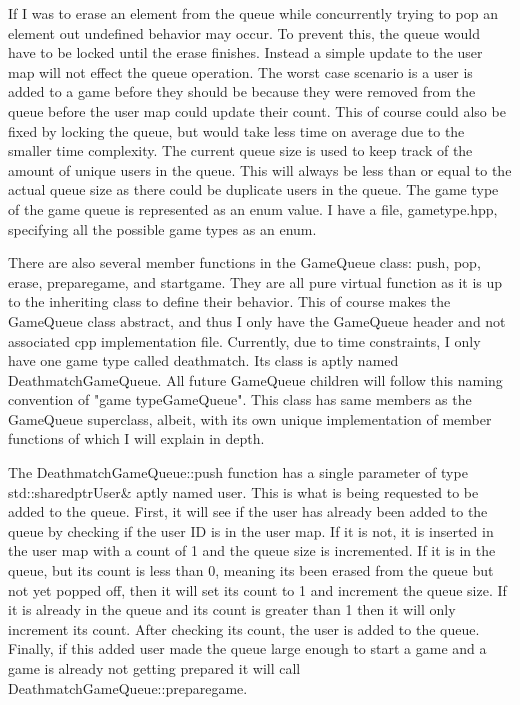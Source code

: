 \documentclass[conference]{IEEEtran}
\begin{document}
If I was to erase an element from the queue while concurrently trying to pop an element out undefined behavior may occur.
To prevent this, the queue would have to be locked until the erase finishes.
Instead a simple update to the user map will not effect the queue operation.
The worst case scenario is a user is added to a game before they should be because they were removed from the queue before the user map could update their count.
This of course could also be fixed by locking the queue, but would take less time on average due to the smaller time complexity.
The current queue size is used to keep track of the amount of unique users in the queue.
This will always be less than or equal to the actual queue size as there could be duplicate users in the queue.
The game type of the game queue is represented as an enum value.
I have a file, game\textunderscore type.hpp, specifying all the possible game types as an enum.

There are also several member functions in the GameQueue class: push, pop, erase, prepare\textunderscore game, and start\textunderscore game.
They are all pure virtual function as it is up to the inheriting class to define their behavior.
This of course makes the GameQueue class abstract, and thus I only have the GameQueue header and not associated cpp implementation file.
Currently, due to time constraints,  I only have one game type called deathmatch.
Its class is aptly named DeathmatchGameQueue.
All future GameQueue children will follow this naming convention of "\textlangle game type\textrangle GameQueue".
This class has same members as the GameQueue superclass, albeit, with its own unique implementation of member functions of which I will explain in depth.

The DeathmatchGameQueue::push function has a single parameter of type std::shared\textunderscore ptr\textlangle User\textrangle \& aptly named user.
This is what is being requested to be added to the queue.
First, it will see if the user has already been added to the queue by checking if the user ID is in the user map.
If it is not, it is inserted in the user map with a count of 1 and the queue size is incremented.
If it is in the queue, but its count is less than 0, meaning its been erased from the queue but not yet popped off, then it will set its count to 1 and increment the queue size.
If it is already in the queue and its count is greater than 1 then it will only increment its count. 
After checking its count, the user is added to the queue.
Finally, if this added user made the queue large enough to start a game and a game is already not getting prepared it will call DeathmatchGameQueue::prepare\textunderscore game.
\end{document}
